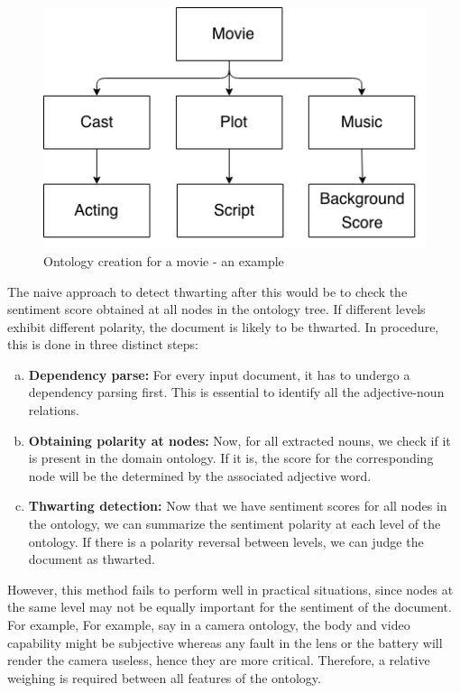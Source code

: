 \begin{figure}[t]
\centering
\includegraphics[scale=0.6]{gfx/onto.png}
\caption{Ontology creation for a movie - an example }

\end{figure}

The naive approach to detect thwarting after this would be to check the sentiment score obtained at all nodes in the ontology tree. If different levels exhibit different polarity,
the document is likely to be thwarted. In procedure, this is done in three distinct steps:

\begin{enumerate}[(a)]%
\setlength{\itemsep}{15pt}
\item \textbf{Dependency parse: } For every input document, it has to undergo a dependency parsing first. This is essential to identify all the adjective-noun relations.

\item \textbf{Obtaining polarity at nodes: } Now, for all extracted nouns, we check if it is present in the domain ontology. If it is, the score for the corresponding node
will be the determined by the associated adjective word. 

\item \textbf{Thwarting detection: } Now that we have sentiment scores for all nodes in the ontology, we can summarize the sentiment polarity at each level of the ontology.
If there is a polarity reversal between levels, we can judge the document as thwarted.

\end{enumerate} 

\vspace{8mm}

However, this method fails to perform well in practical situations, since nodes at the same level may not be equally important for the sentiment of the document. For example,
For example, say in a camera ontology, the body and video capability might be subjective whereas any fault in the lens or the battery will render the camera useless, hence they are more critical.
Therefore, a relative weighing is required between all features of the ontology.

